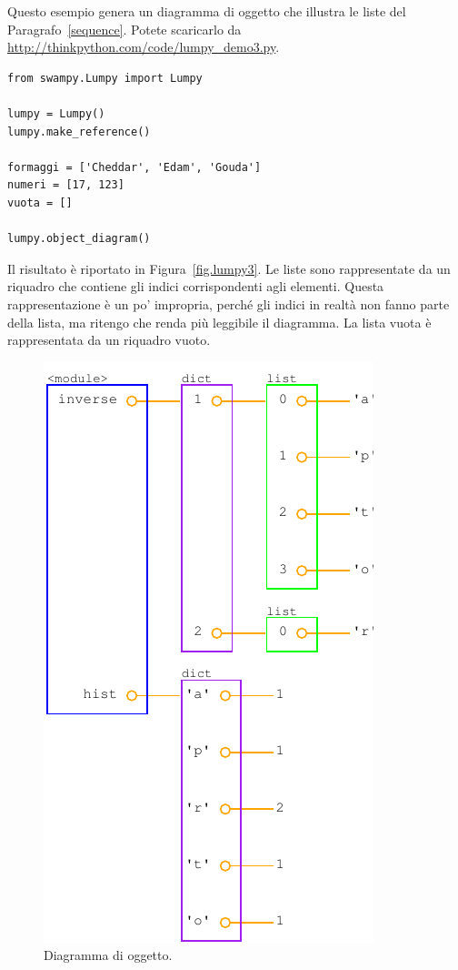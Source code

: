 \documentclass[10pt]{book}
\begin{document}
Questo esempio genera un diagramma di oggetto che illustra le liste del Paragrafo~\ref{sequence}.  Potete scaricarlo da
\url{http://thinkpython.com/code/lumpy_demo3.py}.

\begin{verbatim}
from swampy.Lumpy import Lumpy

lumpy = Lumpy()
lumpy.make_reference()

formaggi = ['Cheddar', 'Edam', 'Gouda']
numeri = [17, 123]
vuota = []

lumpy.object_diagram()
\end{verbatim}

Il risultato è riportato in Figura~\ref{fig.lumpy3}.  Le liste sono rappresentate da un riquadro che contiene gli indici corrispondenti agli elementi. Questa rappresentazione è un po' impropria, perché gli indici in realtà non fanno parte della lista, ma ritengo che renda più leggibile il diagramma. La lista vuota è rappresentata da un riquadro vuoto.

\begin{figure}
\centerline
{\includegraphics[scale=0.7]{figs/lumpydemo4.pdf}}
\caption{Diagramma di oggetto.}
\label{fig.lumpy4}
\end{figure}
\end{document}

